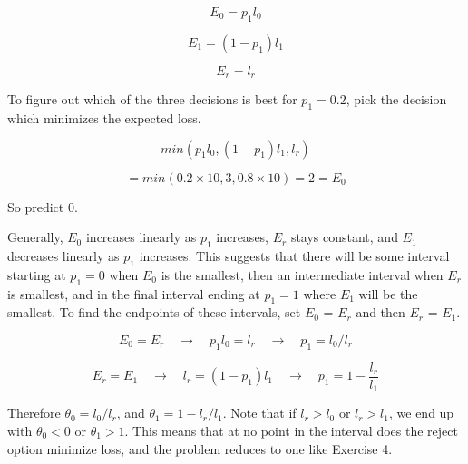 \documentclass{article}
\begin{document}
\[
E_0 = p_1l_0 
\]

\[
E_1 = (1-p_1)l_1
\]

\[
E_r = l_r
\]

To figure out which of the three decisions is best for $p_1 = 0.2$, pick the
decision which minimizes the expected loss.

\[
min(p_1l_0, (1-p_1)l_1, l_r)
\]

\[
= min(0.2 \times 10, 3, 0.8 \times 10) = 2 = E_0
\]

So predict 0.

\vspace{1em}

Generally, $E_0$ increases linearly as $p_1$ increases, $E_r$ stays constant,
and $E_1$ decreases linearly as $p_1$ increases. This suggests that there will
be some interval starting at $p_1 = 0$ when $E_0$ is the smallest, then an
intermediate interval when $E_r$ is smallest, and in the final interval ending
at $p_1 = 1$ where $E_1$
will be the smallest. To find the endpoints of these intervals, set
$E_0$ = $E_r$ and then $E_r$ = $E_1$.

\[
E_0 = E_r \hspace{1em} \rightarrow \hspace{1em} p_1l_0 = l_r 
\hspace{1em} \rightarrow \hspace{1em} p_1 = l_0/l_r
\]

\[
E_r = E_1 \hspace{1em} \rightarrow \hspace{1em} l_r = (1-p_1)l_1 \hspace{1em}
\rightarrow \hspace{1em} p_1 = 1-\frac{l_r}{l_1}
\]

Therefore $\theta_0 = l_0/l_r$, and $\theta_1 = 1-l_r/l_1$. Note that if
$l_r > l_0$ or $l_r > l_1$, we end up with $\theta_0 < 0$ or $\theta_1 > 1$.
This means that at no point in the interval does the reject option minimize 
loss, and the problem reduces to one like Exercise 4.
\end{document}
